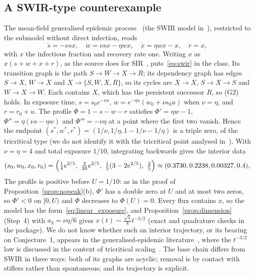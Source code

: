 \documentclass[11pt,a4paper]{article}
\theoremstyle{definition}\newtheorem{definition}[theorem]{Definition}
\theoremstyle{remark}\newtheorem{remark}[theorem]{Remark}
\begin{document}
\subsection{A SWIR-type counterexample}
\label{sec:swir}
The mean-field generalised epidemic process~\cite[Sec.~II, eq.~(2.3)]{Janssen}
(the SWIR model in~\cite{ChoiLeeKahng}), restricted to the submodel
without direct infection, reads
\begin{equation}
\dot s=-\nu sx,\quad \dot w=\nu sx-\eta wx,\quad \dot x=\eta wx-x,\quad \dot r=x,
\label{eq:swir}
\end{equation}
with $x$ the infectious fraction and recovery rate one. Writing $x$ as
$x(s+w+x+r)$, as the source does for SIR~\cite[eq.~(8), p.~9]{CCM},
puts~\eqref{eq:swir} in the class. Its transition graph is the path
$S\to W\to X\to R$; its dependency graph has edges $S\to X$, $W\to X$
and $X\to\{S,W,X,R\}$, so its cycles are $X\to X$, $S\to X\to S$ and
$W\to X\to W$. Each contains $X$, which has the persistent successor
$R$, so (G2) holds. In exposure time, $s=s_0e^{-\nu u}$,
$w=e^{-\eta u}(w_0+\nu s_0u)$ when $\nu=\eta$, and $r=r_0+u$. The
profile $\Phi=1-s-w-r$ satisfies $\Phi'=\eta w-1$,
$\Phi''=\eta(\nu s-\eta w)$ and $\Phi'''=-\nu\eta$ at a point where the
first two vanish. Hence the endpoint
$(s^*,w^*,r^*)=(1/\nu,1/\eta,1-1/\nu-1/\eta)$ is a triple zero, of the tricritical type
(we do not identify it with the tricritical point analysed
in~\cite{Janssen}). With $\nu=\eta=4$ and total exposure
$1/10$, integrating backwards gives the interior data
\begin{equation}
(s_0,w_0,x_0,r_0)=\Bigl(\tfrac14e^{2/5},\ \tfrac3{20}e^{2/5},\
\tfrac15(3-2e^{2/5}),\ \tfrac25\Bigr)\approx(0.3730,0.2238,0.00327,0.4),
\label{eq:swirdata}
\end{equation}
The profile is positive before $U=1/10$: as in the proof of
Proposition~\ref{prop:nopeak}(b), $\Phi'$ has a double zero at $U$ and at
most two zeros, so $\Phi'<0$ on $[0,U)$ and $\Phi$ decreases to
$\Phi(U)=0$. Every flux contains $x$, so the model has the
form~\eqref{eq:linear_exposure}, and Proposition~\ref{prop:dimension}
(Step~4) with $a_3=\nu\eta/6$ gives
$x(t)\sim\frac{\sqrt3}{8}t^{-3/2}$ (exact and quadrature checks in the
package). We do not know whether such an interior trajectory, or its
bearing on Conjecture~1, appears in the generalised-epidemic
literature~\cite{Grassberger1983,Janssen,Bizhani,ChoiLeeKahng,JanssenStenull},
where the $t^{-3/2}$ law is discussed in the context of tricritical
scaling~\cite[Sec.~V]{Janssen}. The base chain differs from SWIR in
three ways: both of its graphs are acyclic; removal is by contact with
stiflers rather than spontaneous; and its trajectory is explicit.
\end{document}
